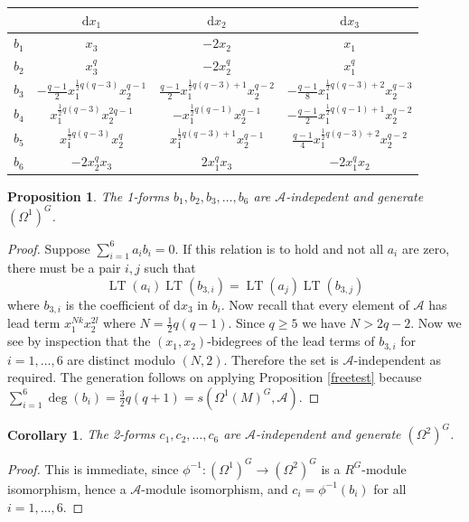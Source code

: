 \documentclass[a4paper]{amsart}
\newcommand{\dd}{\mathrm{d}}
\def\LT{\operatorname{LT}}
\newtheorem{cor}[Lemma]{Corollary}
\newtheorem{prop}[Lemma]{Proposition}
\newtheorem*{Corollary of Conjecture}{Corollary of Conjecture}
\theoremstyle{definition}
\theoremstyle{remark}
\theoremstyle{Acknowledgments}
\begin{document}
\vspace{1cm}
\begin{tabular}{|c||c|c|c|} \hline
 & $\dd x_1$ &  $\dd x_2$ &  $\dd x_3$ \\ \hline \hline
$b_1$ & $x_3$ & $-2x_2$ & $x_1$\\ \hline
$b_2$ & $x_3^q$ & $-2x_2^q$ & $x_1^q$\\ \hline
$b_3$ & $-\frac{q-1}{2}x_1^{\frac12 q(q-3)}x_2^{q-1}$ & $\frac{q-1}{2}x_1^{\frac12 q(q-3)+1}x_2^{q-2}$ & $-\frac{q-1}{8}x_1^{\frac12 q(q-3)+2}x_2^{q-3}$\\ \hline
$b_4$ &  $x_1^{\frac{1}{2}q(q-3)}x_2^{2q-1}$ & $ -x_1^{\frac{1}{2}q(q-1)}x_2^{q-1}$   & $-\frac{q-1}{2}x_1^{\frac{1}{2}q(q-1)+1}x_2^{q-2}$\\ \hline
$b_5$ &  $x_1^{\frac12 q(q-3)}x_2^{q}$& $ x_1^{\frac12 q(q-3)+1}x_2^{q-1}$   & $\frac{q-1}{4} x_1^{\frac12 q(q-3)+2}x_2^{q-2}$\\ \hline
 $b_6$ & $-2x_2^qx_3$  & $2x_1^qx_3$ & $ -2x_1^qx_2$ \\ \hline
\end{tabular}
\vspace{1cm}

\begin{prop} The 1-forms $b_1,b_2,b_3, \ldots, b_6$ are $\mathcal{A}$-indepedent and generate $(\Omega^1)^G$.
\end{prop}

\begin{proof}
Suppose $\sum_{i=1}^6 a_ib_i=0$. If this relation is to hold and not all $a_i$ are zero, there must be a pair $i,j$ such that
\[\LT(a_i)\LT(b_{3,i})= \LT(a_j)\LT(b_{3,j})\] where $b_{3,i}$ is the coefficient of $\dd x_3$ in $b_i$. Now recall that every element of $\mathcal{A}$ has lead term $x_1^{Nk}x_2^{2l}$ where $N = \frac12q(q-1)$. Since $q \geq 5$ we have $N>2q-2$. Now we see by inspection that the $(x_1,x_2)$-bidegrees of the lead terms of $b_{3,i}$ for $i=1, \ldots, 6$ are distinct modulo $(N,2)$. Therefore the set is $\mathcal{A}$-independent as required. The generation follows on applying Proposition \ref{freetest} because $\sum_{i=1}^6 \deg(b_i) = \frac32 q(q+1) = s(\Omega^1(M)^G, \mathcal{A})$.
\end{proof}

\begin{cor}
The 2-forms $c_1,c_2, \ldots, c_6$ are $\mathcal{A}$-independent and generate $(\Omega^2)^G$.
\end{cor}

\begin{proof}
This is immediate, since $\phi^{-1}: (\Omega^1)^G \rightarrow (\Omega^2)^G$ is a $R^G$-module isomorphism, hence a $\mathcal{A}$-module isomorphism, and $c_i = \phi^{-1}(b_i)$ for all $i=1, \ldots, 6$.
\end{proof}
\end{document}
